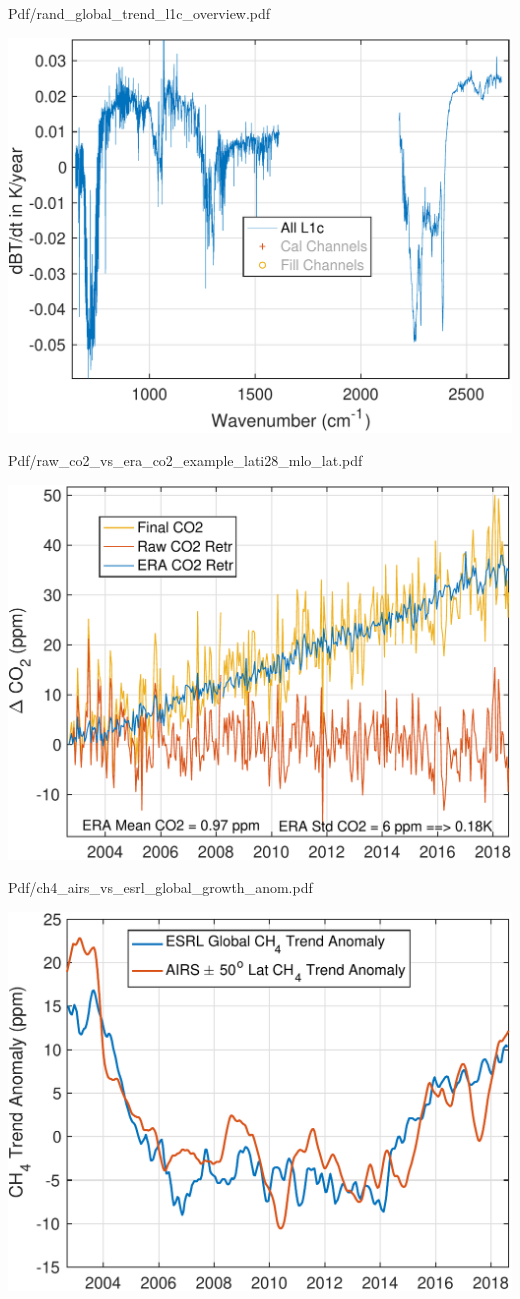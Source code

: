 \documentclass[presentation]{beamer}
\begin{document}
\begin{frame}[label={sec:orge2e4323}]{Pdf/rand\_global\_trend\_l1c\_overview.pdf}
\begin{center}
\includegraphics[width=0.7\linewidth]{./Figs/Pdf/rand_global_trend_l1c_overview.pdf}
\end{center}
\end{frame}




\begin{frame}[label={sec:org18c05b1}]{Pdf/raw\_co2\_vs\_era\_co2\_example\_lati28\_mlo\_lat.pdf}
\begin{center}
\includegraphics[width=0.7\linewidth]{./Figs/Pdf/raw_co2_vs_era_co2_example_lati28_mlo_lat.pdf}
\end{center}
\end{frame}

\begin{frame}[label={sec:org9eb2e65}]{Pdf/ch4\_airs\_vs\_esrl\_global\_growth\_anom.pdf}
\begin{center}
\includegraphics[width=0.7\linewidth]{./Figs/Pdf/ch4_airs_vs_esrl_global_growth_anom.pdf}
\end{center}
\end{frame}
\end{document}
